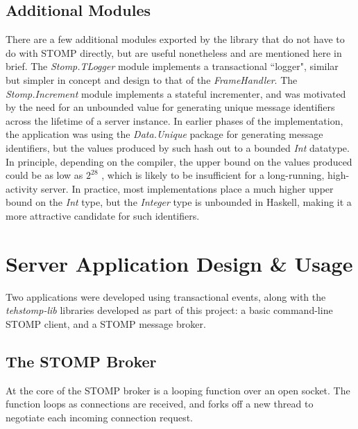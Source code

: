 \documentclass[conference, letterpaper]{IEEEtran}
\begin{document}
\subsection{Additional Modules}
There are a few additional modules exported by the library that do not have to do with STOMP directly, but are useful nonetheless and are mentioned here in brief. The \textit{Stomp.TLogger} module implements a transactional ``logger", similar but simpler in concept and design to that of the \textit{FrameHandler}. The \textit{Stomp.Increment} module implements a stateful incrementer, and was motivated by the need for an unbounded value for generating unique message identifiers across the lifetime of a server instance. In earlier phases of the implementation, the application was using the \textit{Data.Unique} package for generating message identifiers, but the values produced by such hash out to a bounded \textit{Int} datatype. In principle, depending on the compiler, the upper bound on the values produced could be as low as \begin{math}2^{28}\end{math} \cite{data:int}, which is likely to be insufficient for a long-running, high-activity server. In practice, most implementations place a much higher upper bound on the \textit{Int} type, but the \textit{Integer} type is unbounded in Haskell, making it a more attractive candidate for such identifiers.
\section{Server Application Design \& Usage}

Two applications were developed using transactional events, along with the \textit{tehstomp-lib} libraries developed as part of this project: a basic command-line STOMP client, and a STOMP message broker.

\subsection{The STOMP Broker}

At the core of the STOMP broker is a looping function over an open socket. The function loops as connections are received, and forks off a new thread to negotiate each incoming connection request. 
\end{document}
